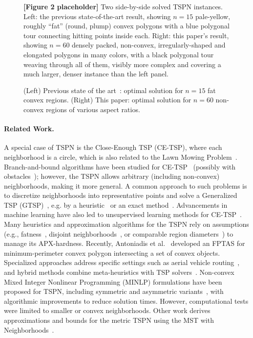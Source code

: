 \documentclass[11pt,a4paper]{article}
\theoremstyle{plain}
\begin{document}
\begin{figure}[h]
\centering
\begin{figplaceholder}
\textbf{[Figure 2 placeholder]} Two side-by-side solved TSPN instances. Left: the previous state-of-the-art result, showing $n=15$ pale-yellow, roughly ``fat'' (round, plump) convex polygons with a blue polygonal tour connecting hitting points inside each. Right: this paper's result, showing $n=60$ densely packed, non-convex, irregularly-shaped and elongated polygons in many colors, with a black polygonal tour weaving through all of them, visibly more complex and covering a much larger, denser instance than the left panel.
\end{figplaceholder}
\caption{(Left) Previous state of the art~\cite{ref29}: optimal solution for $n = 15$ fat convex regions. (Right) This paper: optimal solution for $n = 60$ non-convex regions of various aspect ratios.}
\label{fig:2}
\end{figure}

\paragraph{Related Work.} A special case of TSPN is the Close-Enough TSP (CE-TSP), where each neighborhood is a circle, which is also related to the Lawn Mowing Problem~\cite{ref4,ref5,ref26,ref27}. Branch-and-bound algorithms have been studied for CE-TSP~\cite{ref19,ref13} (possibly with obstacles~\cite{ref15}); however, the TSPN allows arbitrary (including non-convex) neighborhoods, making it more general. A common approach to such problems is to discretize neighborhoods into representative points and solve a Generalized TSP (GTSP)~\cite{ref35}, e.g. by a heuristic~\cite{ref32,ref41} or an exact method~\cite{ref9,ref16}. Advancements in machine learning have also led to unsupervised learning methods for CE-TSP~\cite{ref25,ref24}. Many heuristics and approximation algorithms for the TSPN rely on assumptions (e.g., fatness~\cite{ref38,ref23}, disjoint neighborhoods~\cite{ref14}, or comparable region diameters~\cite{ref21}) to manage its APX-hardness. Recently, Antoniadis et al.~\cite{ref2} developed an FPTAS for minimum-perimeter convex polygon intersecting a set of convex objects. Specialized approaches address specific settings such as aerial vehicle routing~\cite{ref34}, and hybrid methods combine meta-heuristics with TSP solvers~\cite{ref44}. Non-convex Mixed Integer Nonlinear Programming (MINLP) formulations have been proposed for TSPN, including symmetric and asymmetric variants~\cite{ref29}, with algorithmic improvements to reduce solution times. However, computational tests were limited to smaller or convex neighborhoods. Other work derives approximations and bounds for the metric TSPN using the MST with Neighborhoods~\cite{ref11}.
\end{document}
